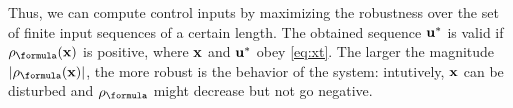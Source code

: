 Thus, we can compute control inputs by maximizing the robustness over the set of finite input sequences of a certain length.
The obtained sequence $\mathbf{u}^*$ is valid if $\robf(\sstraj)$ is positive, where $\mathbf{x}$ and $\mathbf{u}^*$ obey \eqref{eq:xt}.
The larger the magnitude $|\robf(\sstraj)|$, the more robust is the behavior of the system: intutively, $\mathbf{x}$ can be disturbed and $\robf$ might decrease but not go negative.
